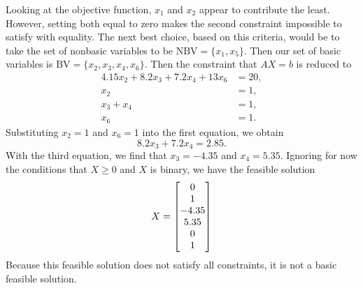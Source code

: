 \documentclass[12pt]{article}
\theoremstyle{definition}
\begin{document}
Looking at the objective function, $x_1$ and $x_2$ appear to contribute the least. However, setting both equal to zero makes the second constraint impossible to satisfy with equality. The next best choice, based on this criteria, would be to take the set of nonbasic variables to be $\textrm{NBV} = \{x_1, x_5\}$. Then our set of basic variables is $\textrm{BV} = \{x_2, x_3, x_4, x_6\}$. Then the constraint that $AX = b$ is reduced to
\begin{align*}
    4.15x_2 + 8.2x_3 + 7.2x_4 + 13x_6 &= 20, \\
    x_2 &= 1, \\
    x_3 + x_4 &= 1, \\
    x_6 &= 1.
\end{align*}
Substituting $x_2 = 1$ and $x_6 = 1$ into the first equation, we obtain
\[
    8.2x_3 + 7.2x_4 = 2.85.
\]
With the third equation, we find that $x_3 = - 4.35$ and $x_4 = 5.35$. Ignoring for now the conditions that $X \geq 0$ and $X$ is binary, we have the feasible solution
\[
    X = \mqty[0 \\ 1 \\ -4.35 \\ 5.35 \\ 0 \\ 1]
\]
Because this feasible solution does not satisfy all constraints, it is not a basic feasible solution.
\end{document}
